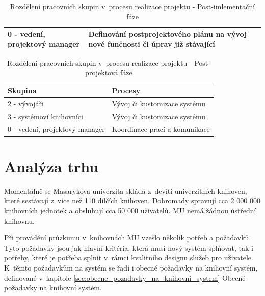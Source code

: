 \documentclass[
	11pt, oneside, printed, final, palatino, monochrome
	microtype,
	table,   %
	lof,     %
	lot     %
]{fithesis3}
\newcommand{\bold}[1]{\textbf{#1}}
\begin{document}
{\begin{table}
\begin{tabular}{| p{3cm} | p{8.3cm} |}
	0 - vedení, projektový manager
    & 
    Definování postprojektového plánu na vývoj nové funčnosti či úprav již stávající
    \\ \hline
    
    \end{tabular}
    \caption{Rozdělení pracovních skupin v~procesu realizace projektu - Post-imlementační fáze}
\end{table}

\begin{table}
    \centering
    \begin{tabular}{| p{3cm} | p{8.3cm} |}
    \hline
    \bold{Skupina} 	
    & 
    \bold{Procesy} 
    \\ \hline
    
	2 - vývojáři
    & 
	Vývoj či kustomizace systému
    \\ \hline
    
	3 - systémoví knihovníci
    & 
    Vývoj či kustomizace systému
    \\ \hline
    
	0 - vedení, projektový manager
    & 
    Koordinace prací a komunikace
    \\ \hline
    
    \end{tabular}
    \caption{Rozdělení pracovních skupin v~procesu realizace projektu - Post-projektová fáze}
\end{table}

\section{Analýza trhu}
Momentálně se Masarykova univerzita skládá z~devíti univerzitních knihoven, které sestávají z~více než 110 dílčích knihoven. Dohromady spravují cca 2 000 000 knihovních jednotek a obsluhují cca 50 000 uživatelů. MU nemá žádnou ústřední knihovnu.

Při provádění průzkumu v~knihovnách MU vzešlo několik potřeb a požadavků. Tyto požadavky jsou jak hlavní kritéria, která musí nový systém splňovat, tak i potřeby, které je potřeba splnit v~rámci kvalitního designu služeb pro uživatele. K~těmto požadavkům na systém se řadí i obecné požadavky na knihovní systém, definované v~kapitole \ref{sec:obecne_pozadavky_na_knihovni_system} Obecné požadavky na knihovní systém.

}
\end{document}
